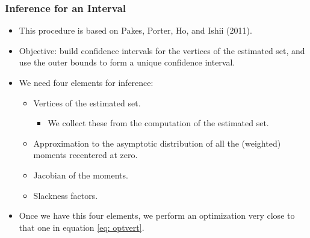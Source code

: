 \begin{frame}[label=estsetb]
\frametitle{Inference for an Interval}

\begin{itemize}
	\item This procedure is based on Pakes, Porter, Ho, and Ishii (2011).
	\item Objective: build confidence intervals for the vertices of the estimated set, and use the outer bounds to form a unique confidence interval.
	\item We need four elements for inference:
	\begin{itemize}
		\item Vertices of the estimated set.
		\begin{itemize}
			\item We collect these from the computation of the estimated set.
		\end{itemize}
		\item Approximation to the asymptotic distribution of all the (weighted) moments recentered at zero.
		\item Jacobian of the moments.
		\item Slackness factors.
	\end{itemize}
	\item Once we have this four elements, we perform an optimization very close to that one in equation \eqref{eq: optvert}.
\end{itemize}
\hyperlink{estset}{}
\end{frame}
